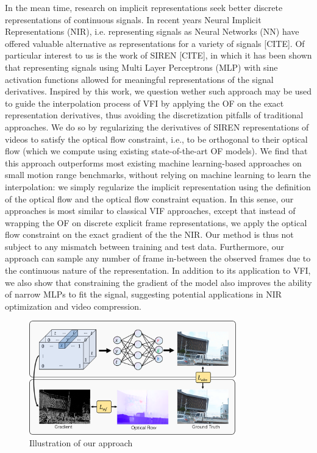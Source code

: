\documentclass{article}
\begin{document}
In the mean time, research on implicit representations seek better discrete representations of continuous signals.
In recent years Neural Implicit Representations (NIR), i.e. representing signals as Neural Networks (NN) have offered valuable
alternative as representations for a variety of signals [CITE].
Of particular interest to us is the work of SIREN [CITE], in which it has been shown that representing
signals using Multi Layer Perceptrons (MLP) with sine activation functions
allowed for meaningful representations of the signal derivatives.
Inspired by this work, we question wether such approach may be used to guide the interpolation
process of VFI by applying the OF on the exact representation derivatives,
thus avoiding the discretization pitfalls of traditional approaches.
We do so by regularizing the derivatives of SIREN representations of videos to satisfy the optical flow constraint,
i.e., to be orthogonal to their optical flow
(which we compute using existing state-of-the-art OF models).
We find that this approach outperforms most existing machine learning-based approaches on small motion range benchmarks,
without relying on machine learning to learn the interpolation:
we simply regularize the implicit representation using the definition
of the optical flow and the optical flow constraint equation.
In this sense, our approaches is most similar to classical VIF approaches,
except that instead of wrapping the OF on discrete explicit frame representations,
we apply the optical flow constraint on the exact gradient of the the NIR.
Our method is thus not subject to any mismatch between training and test data.
Furthermore, our approach can sample any number of frame in-between the observed frames
due to the continuous nature of the representation.
In addition to its application to VFI, we also show that constraining the gradient
of the model also improves the ability of narrow MLPs to fit the signal,
suggesting potential applications in NIR optimization and video compression.

\begin{figure}[h]
\centering
\includegraphics[width=0.8\textwidth]{Method}
\caption{Illustration of our approach}
\end{figure}
\end{document}

